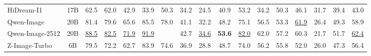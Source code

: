 \begin{table}[t]
{\begin{tabular}{lcccccccccccccccc}
HiDream-I1                       & 17B                                & 62.5                                 & 62.0                                 & 42.9                                 & 33.9                                 & \cellcolor[HTML]{E2E2E2}50.3                                 & 34.2                                 & 24.5                                 & 40.9                                 & 53.2                                 & 34.2                                 & 50.3                                 & 46.1                                 & 31.7                                 & \cellcolor[HTML]{E2E2E2}39.4                                 & 43.0                                 \\
Qwen-Image                       & 20B                                & 81.4                                 & 79.6                                 & 65.6                                 & 85.5                                 & \cellcolor[HTML]{E2E2E2}78.0                                 & 41.1                                 & 32.2                                 & 48.2                                 & 75.1                                 & 56.5                                 & 53.3                                 & {\color[HTML]{F88825} \underline{61.9}}    & 26.4                                 & \cellcolor[HTML]{E2E2E2}49.3                                 & 58.9                                 \\
Qwen-Image-2512                  & 20B                                & {\color[HTML]{F88825} \underline{88.5}}    & {\color[HTML]{F88825} \underline{82.5}}    & {\color[HTML]{F88825} \underline{71.9}}    & {\color[HTML]{F88825} \underline{91.9}}    & \cellcolor[HTML]{E2E2E2}{\color[HTML]{F88825} \underline{83.7}}    & 42.7                                 & {\color[HTML]{F88825} \underline{34.6}}    & {\color[HTML]{F88825} \textbf{53.6}} & {\color[HTML]{F88825} \underline{82.0}}    & 62.0                                 & 57.2                                 & 60.3                                 & 21.7                                 & \cellcolor[HTML]{E2E2E2}51.7                                 & {\color[HTML]{F88825} \underline{62.4}}    \\
Z-Image-Turbo                    & 6B                                 & 79.5                                 & 72.2                                 & 62.7                                 & 83.9                                 & \cellcolor[HTML]{E2E2E2}74.6                                 & 36.9                                 & 28.8                                 & 48.7                                 & 74.0                                 & 56.2                                 & 55.8                                 & 52.0                                 & 26.0                                 & \cellcolor[HTML]{E2E2E2}47.3                                 & 56.4                                 \\

\end{tabular}}
\end{table}
